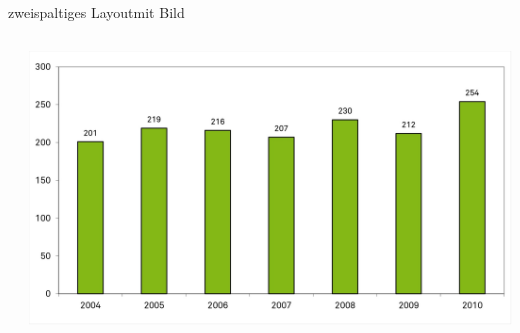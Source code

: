 \documentclass[t]{beamer}
\begin{document}
\begin{frame}{zweispaltiges Layout}{mit Bild}
\begin{columns}[T]
\begin{column}{0.49\textwidth}
        \end{column}
        \begin{column}{0.49\textwidth}
            \includegraphics[width=\textwidth]{./image24.jpg}
        \end{column}
    \end{columns}
\end{frame}
\end{document}
